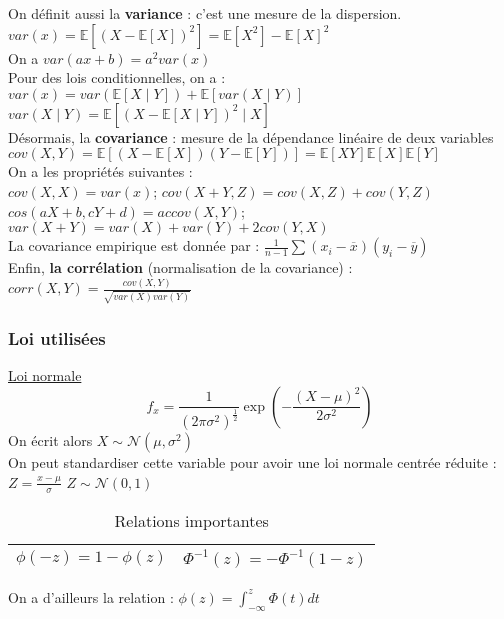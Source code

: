 \documentclass[../main.tex]{subfiles}
\begin{document}
On définit aussi la \textbf{variance} : c'est une mesure de la dispersion.\\
$var(x) = \mathbb{E}[(X-\mathbb{E}[X])^2] = \mathbb{E}[X^2] - \mathbb{E}[X]^2$\\

On a $var(ax+b) = a^2var(x)$\\

Pour des lois conditionnelles, on a : 
$var(x) = var(\mathbb{E}[X\mid Y]) + \mathbb{E}[var(X\mid Y)]$\\
$var(X\mid Y) = \mathbb{E}[(X-\mathbb{E}[X\mid Y])^2\mid X]$\\

Désormais, la \textbf{covariance} : mesure de la dépendance linéaire de deux variables\\
$cov(X,Y) = \mathbb{E}[(X-\mathbb{E}[X])(Y-\mathbb{E}[Y])] = \mathbb{E}[XY]\mathbb{E}[X]\mathbb{E}[Y]$\\

On a les propriétés suivantes :\\
$cov(X,X) = var(x)$; $cov(X+Y,Z) = cov(X,Z) + cov(Y,Z)$\\
$cos(aX+b, cY+d) = ac cov(X,Y)$; $var(X+Y) = var(X)+var(Y) + 2cov(Y,X)$\\

La covariance empirique est donnée par : $\frac{1}{n-1} \sum(x_i-\overline{x})(y_i-\overline{y})$\\

Enfin, \textbf{la corrélation} (normalisation de la covariance) : \\
$corr(X,Y) = \frac{cov(X,Y)}{\sqrt{var(X)var(Y)}}$\\

\subsubsection{Loi utilisées}

\quad \underline{Loi normale}
\begin{equation}
    f_x = \frac{1}{(2\pi \sigma^2)^{\frac{1}{2}}} \exp{(-\frac{(X-\mu)^2}{2\sigma^2})}
\end{equation}
On écrit alors $X \sim \mathcal{N}(\mu, \sigma^2)$\\
On peut standardiser cette variable pour avoir une loi normale centrée réduite : \\
$Z = \frac{x-\mu}{\sigma}$ $Z \sim \mathcal{N}(0,1)$\\

\begin{table}[hbt!]
    \centering
    \begin{tabular}{||c|c|}
\hline
      $\phi(-z) = 1-\phi(z)$   & $\Phi^{-1}(z) = -\Phi^{-1}(1-z)$ \\
    \hline
    \end{tabular}
    \caption{Relations importantes}
\end{table}
On a d'ailleurs la relation : $\phi(z) = \int_{-\infty}^z \Phi(t)dt$\\
\end{document}
